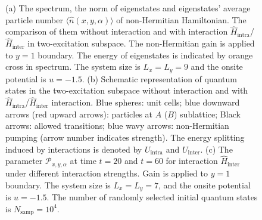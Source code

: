 \documentclass[longbibliography, aps, prx, amsmath, amssymb, amsfonts, twocolumn,superscriptaddress, footinbib]{revtex4-1}
\begin{document}
\begin{figure}[htbp]
{		%
		(a) The spectrum, the norm of eigenstates and eigenstates' average particle number $\langle \hat{n}(x,y,\alpha) \rangle$ of non-Hermitian Hamiltonian. The comparison of them without interaction and with interaction  $\hat{H}_{\text{intra}}$/$\hat{H}_{\text{inter}}$ in two-excitation subspace. The non-Hermitian gain is applied to $y=1$ boundary. The energy of eigenstates is indicated by orange cross in spectrum. 
		The system size is $L_x=L_y=9$ and the onsite potential is $u=-1.5$. 
		(b) Schematic representation of quantum states in the two-excitation subspace without interaction and with $\hat{H}_{\text{intra}}$/$\hat{H}_{\text{inter}}$ interaction. 
		Blue spheres: unit cells; blue downward arrows (red upward arrows): particles at $A$ ($B$) sublattice; Black arrows: allowed transitions; blue wavy arrows: non-Hermitian pumping (arrow number indicates strength). 
		The energy splitting induced by interactions is denoted by $U_{\text{intra}}$ and $U_{\text{inter}}$.
		(c) The parameter $\mathcal{P}_{x,y,\alpha}$ at time $t=20$ and $t=60$ for interaction $\hat{H}_{\text{inter}}$ under different interaction strengths. Gain is applied to $y=1$ boundary. The system size is $L_x=L_y=7$, and the onsite potential is $u=-1.5$. The number of randomly selected initial quantum states is $N_{\text{samp}}=10^4$.
		}
		\label{fig:02}
	\end{figure}
\end{document}

